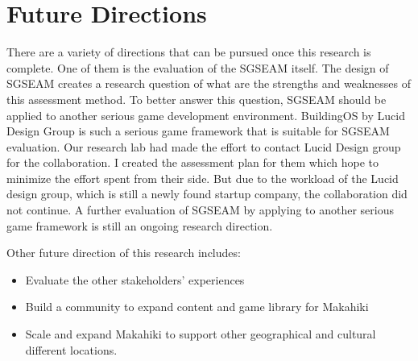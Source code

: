 \section{Future Directions}

There are a variety of directions that can be pursued once this research is complete. One of them is the evaluation of the SGSEAM itself. The design of SGSEAM creates a research question of what are the strengths and weaknesses of this assessment method. 
To better answer this question, SGSEAM should be applied to another serious game development environment. BuildingOS\cite{building-dashboard} by Lucid Design Group is such a serious game framework that is suitable for SGSEAM evaluation. Our research lab had made the effort to contact Lucid Design group for the collaboration. I created the assessment plan for them which hope to minimize the effort spent from their side. But due to the workload of the Lucid design group, which is still a newly found startup company, the collaboration did not continue. A further evaluation of SGSEAM by applying to another serious game framework is still an ongoing research direction.

Other future direction of this research includes:
\begin{itemize}
	\item Evaluate the other stakeholders’ experiences

    \item Build a community to expand content and game library for Makahiki

    \item Scale and expand Makahiki to support other geographical and cultural different locations.

\end{itemize}

